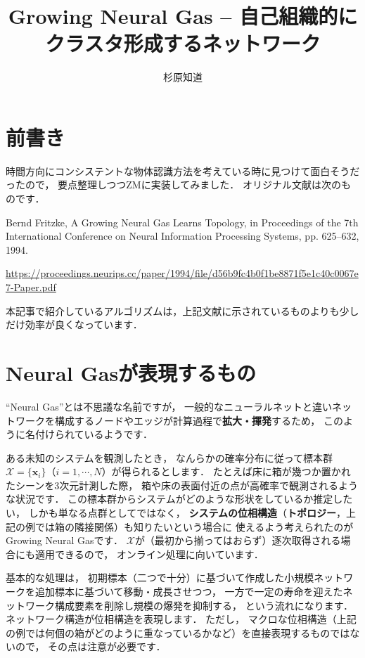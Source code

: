 ﻿\documentclass{jsarticle}
\title{\Large {\bf Growing Neural Gas -- 自己組織的にクラスタ形成するネットワーク}}
\author{杉原知道}
\begin{document}

\maketitle

\section{前書き}

時間方向にコンシステントな物体認識方法を考えている時に見つけて面白そうだったので，
要点整理しつつZMに実装してみました．
オリジナル文献は次のものです．

Bernd Fritzke, A Growing Neural Gas Learns Topology, in Proceedings of the 7th International Conference on Neural Information Processing Systems, pp. 625--632, 1994.

\url{https://proceedings.neurips.cc/paper/1994/file/d56b9fc4b0f1be8871f5e1c40c0067e7-Paper.pdf}

本記事で紹介しているアルゴリズムは，上記文献に示されているものよりも少しだけ効率が良くなっています．



\section{Neural Gasが表現するもの}

``Neural Gas''とは不思議な名前ですが，
一般的なニューラルネットと違いネットワークを構成するノードやエッジが計算過程で{\bf 拡大・揮発}するため，
このように名付けられているようです．

ある未知のシステムを観測したとき，
なんらかの確率分布に従って標本群$\mathcal{X}=\{\bm{x}_{i}\}$（$i=1,\cdots,N$）が得られるとします．
たとえば床に箱が幾つか置かれたシーンを3次元計測した際，
箱や床の表面付近の点が高確率で観測されるような状況です．
この標本群からシステムがどのような形状をしているか推定したい，
しかも単なる点群としてではなく，
{\bf システムの位相構造}（{\bf トポロジー}，上記の例では箱の隣接関係）も知りたいという場合に
使えるよう考えられたのがGrowing Neural Gasです．
$\mathcal{X}$が（最初から揃ってはおらず）逐次取得される場合にも適用できるので，
オンライン処理に向いています．

基本的な処理は，
初期標本（二つで十分）に基づいて作成した小規模ネットワークを追加標本に基づいて移動・成長させつつ，
一方で一定の寿命を迎えたネットワーク構成要素を削除し規模の爆発を抑制する，
という流れになります．
ネットワーク構造が位相構造を表現します．
ただし，
マクロな位相構造（上記の例では何個の箱がどのように重なっているかなど）を直接表現するものではないので，
その点は注意が必要です．
\end{document}
